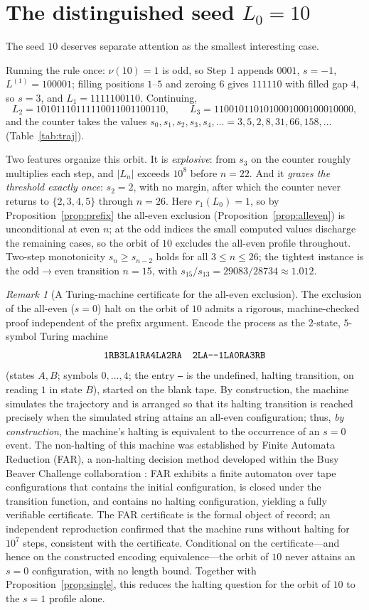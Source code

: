 \documentclass[11pt,reqno]{amsart}
\theoremstyle{plain}
\theoremstyle{definition}
\theoremstyle{remark}
\newtheorem{remark}{Remark}
\begin{document}
\section{The distinguished seed $L_0=10$}\label{sec:seed10}
The seed $10$ deserves separate attention as the smallest interesting case.

Running the rule once: $\nu(10)=1$ is odd, so Step 1 appends $0001$, $s=-1$, $L^{(1)}=100001$; filling positions $1$--$5$ and zeroing $6$ gives $111110$ with filled gap $4$, so $s=3$, and $L_1=1111100110$. Continuing,
\[ L_2=10101110111110011001100110,\qquad L_3=1100101101010001000100010000, \]
and the counter takes the values $s_0,s_1,s_2,s_3,s_4,\dots=3,5,2,8,31,66,158,\dots$ (Table~\ref{tab:traj}).

Two features organize this orbit. It is \emph{explosive}: from $s_3$ on the counter roughly multiplies each step, and $|L_n|$ exceeds $10^8$ before $n=22$. And it \emph{grazes the threshold exactly once}: $s_2=2$, with no margin, after which the counter never returns to $\{2,3,4,5\}$ through $n=26$. Here $r_1(L_0)=1$, so by Proposition~\ref{prop:prefix} the all-even exclusion (Proposition~\ref{prop:alleven}) is unconditional at even $n$; at the odd indices the small computed values discharge the remaining cases, so the orbit of $10$ excludes the all-even profile throughout. Two-step monotonicity $s_n\ge s_{n-2}$ holds for all $3\le n\le 26$; the tightest instance is the odd$\to$even transition $n=15$, with $s_{15}/s_{13}=29083/28734\approx 1.012$.

\begin{remark}[A Turing-machine certificate for the all-even exclusion]\label{rem:TM}
The exclusion of the all-even ($s=0$) halt on the orbit of $10$ admits a rigorous, machine-checked proof independent of the prefix argument. Encode the process as the $2$-state, $5$-symbol Turing machine
\[ \texttt{1RB3LA1RA4LA2RA\quad 2LA---1LA0RA3RB} \]
(states $A,B$; symbols $0,\dots,4$; the entry \texttt{---} is the undefined, halting transition, on reading $1$ in state $B$), started on the blank tape. By construction, the machine simulates the trajectory and is arranged so that its halting transition is reached precisely when the simulated string attains an all-even configuration; thus, \emph{by construction}, the machine's halting is equivalent to the occurrence of an $s=0$ event. The non-halting of this machine was established by Finite Automata Reduction (FAR), a non-halting decision method developed within the Busy Beaver Challenge collaboration \cite{bbc}: FAR exhibits a finite automaton over tape configurations that contains the initial configuration, is closed under the transition function, and contains no halting configuration, yielding a fully verifiable certificate. The FAR certificate is the formal object of record; an independent reproduction confirmed that the machine runs without halting for $10^7$ steps, consistent with the certificate. Conditional on the certificate---and hence on the constructed encoding equivalence---the orbit of $10$ never attains an $s=0$ configuration, with no length bound. Together with Proposition~\ref{prop:single}, this reduces the halting question for the orbit of $10$ to the $s=1$ profile alone.
\end{remark}
\end{document}
